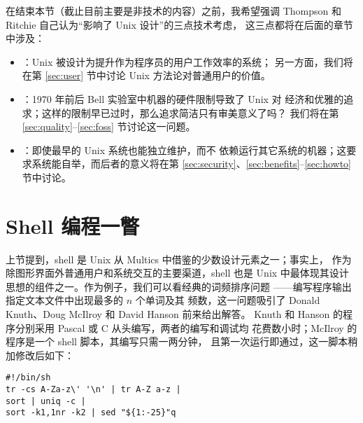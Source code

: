 在结束本节（截止目前主要是非技术的内容）之前，我希望强调 Thompson 和
Ritchie 自己认为“影响了 Unix 设计”的三点技术考虑，
这三点都将在后面的章节中涉及：
\begin{itemize}
\item {}：Unix 被设计为提升作为程序员的用户工作效率的系统；
	另一方面，我们将在第 \ref{sec:user} 节中讨论 Unix 方法论对普通用户的价值。
\item {}：1970 年前后 Bell 实验室中机器的硬件限制导致了 Unix 对
	经济和优雅的追求；这样的限制早已过时，那么追求简洁只有审美意义了吗？
	我们将在第 \ref{sec:quality}--\ref{sec:foss} 节讨论这一问题。
\item {}：即使最早的 Unix 系统也能独立维护，而不
	依赖运行其它系统的机器；这要求系统能自举，而后者的意义将在第
	\ref{sec:security}、\ref{sec:benefits}--\ref{sec:howto} 节中讨论。
\end{itemize}

\section{Shell 编程一瞥}\label{sec:shell}

上节提到，shell 是 Unix 从 Multics 中借鉴的少数设计元素之一；事实上，
作为除图形界面外普通用户和系统交互的主要渠道，shell
也是 Unix 中最体现其设计思想的组件之一。作为例子，我们可以看经典的词频排序问题%
——编写程序输出指定文本文件中出现最多的 $n$ 个单词及其
频数，这一问题吸引了 Donald Knuth、Doug McIlroy 和 David Hanson 前来给出解答。
Knuth 和 Hanson 的程序分别采用 Pascal 或 C 从头编写，两者的编写和调试均
花费数小时；McIlroy 的程序是一个 shell 脚本，其编写只需一两分钟，
且第一次运行即通过，这一脚本稍加修改后如下：
\begin{quoting}
\begin{Verbatim}
#!/bin/sh
tr -cs A-Za-z\' '\n' | tr A-Z a-z |
sort | uniq -c |
sort -k1,1nr -k2 | sed "${1:-25}"q
\end{Verbatim}
\end{quoting}

